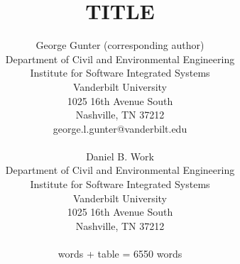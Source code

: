 \documentclass[english,titlepage,oneside,12pt]{article}
\date{}
\newcommand{\kibitz}[2]{\ifnum\Comments=1\textcolor{#1}{#2}\fi}
\newcommand{\Dan}[1]{\kibitz{darkgreen}      {[DBW: #1]}}
\begin{document}
\thispagestyle{empty}
\title{TITLE}

\author{
{\large George Gunter (corresponding author)}\vspace{-1ex}\\
{\normalsize Department of Civil and Environmental Engineering}\vspace{-1ex}\\
{\normalsize Institute for Software Integrated Systems}\vspace{-1ex}\\
{\normalsize Vanderbilt University }\vspace{-1ex}\\
{\normalsize 1025 16th Avenue South}\vspace{-1ex}\\
{\normalsize Nashville, TN 37212 }\vspace{-1ex}\\
{\normalsize george.l.gunter@vanderbilt.edu }\\
{\normalsize{} }\\

{\large Daniel B. Work}\vspace{-1ex}\\
{\normalsize Department of Civil and Environmental Engineering}\vspace{-1ex}\\ 
{\normalsize Institute for Software Integrated Systems}\vspace{-1ex}\\
{\normalsize Vanderbilt University }\vspace{-1ex}\\
{\normalsize 1025 16th Avenue South}\vspace{-1ex}\\
{\normalsize Nashville, TN 37212 }\vspace{-1ex}\\
{\normalsize{} }\\
{\normalsize \wordcount words +  table = 6550 words}}
\thispagestyle{empty}

\maketitle

\newpage
\end{document}
